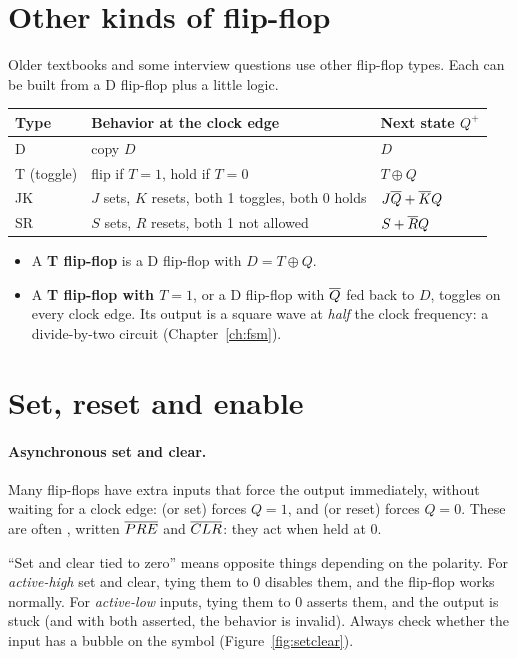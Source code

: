 \section{Other kinds of flip-flop}

Older textbooks and some interview questions use other flip-flop types. Each can be built from a D flip-flop plus a little logic.

\begin{center}
\begin{tabular}{lll}
\toprule
Type & Behavior at the clock edge & Next state $Q^+$ \\
\midrule
D & copy $D$ & $D$ \\
T (toggle) & flip if $T = 1$, hold if $T = 0$ & $T \oplus Q$ \\
JK & $J$ sets, $K$ resets, both 1 toggles, both 0 holds & $J\overline{Q} + \overline{K}Q$ \\
SR & $S$ sets, $R$ resets, both 1 not allowed & $S + \overline{R}Q$ \\
\bottomrule
\end{tabular}
\end{center}

\begin{itemize}
  \item A \textbf{T flip-flop} is a D flip-flop with $D = T \oplus Q$.
  \item A \textbf{T flip-flop with $T = 1$}, or a D flip-flop with $\overline{Q}$ fed back to $D$, toggles on every clock edge. Its output is a square wave at \emph{half} the clock frequency: a divide-by-two circuit (Chapter~\ref{ch:fsm}).
\end{itemize}

\section{Set, reset and enable}

\paragraph{Asynchronous set and clear.} Many flip-flops have extra inputs that force the output immediately, without waiting for a clock edge:  (or set) forces $Q = 1$, and  (or reset) forces $Q = 0$. These are often , written $\overline{PRE}$ and $\overline{CLR}$: they act when held at 0.

\begin{trap}
``Set and clear tied to zero'' means opposite things depending on the polarity. For \emph{active-high} set and clear, tying them to 0 disables them, and the flip-flop works normally. For \emph{active-low} inputs, tying them to 0 asserts them, and the output is stuck (and with both asserted, the behavior is invalid). Always check whether the input has a bubble on the symbol (Figure~\ref{fig:setclear}).
\end{trap}

